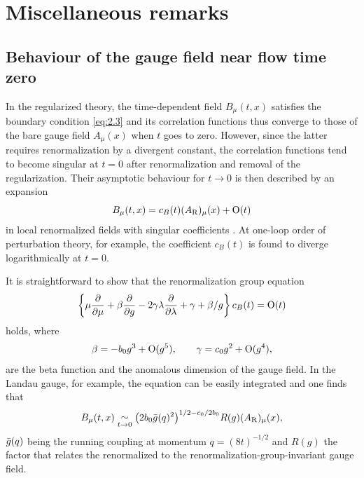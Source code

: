 \section{Miscellaneous remarks}\label{sec:misc}

\subsection{Behaviour of the gauge field near flow time zero}

In the regularized theory, the time-dependent field $B_{\mu}(t,x)$
satisfies the boundary condition \eqref{eq:2.3} and its correlation functions
thus converge to those of the bare gauge field $A_{\mu}(x)$
when $t$ goes to zero. However,
since the latter requires renormalization by a divergent constant,
the correlation functions tend to become singular at $t=0$
after renormalization and removal of the regularization.
Their asymptotic behaviour for $t\to0$ is then
described by an expansion
\begin{equation}
   B_{\mu}(t,x)=c_B(t)(A_{\mathrm{R}})_{\mu}(x)+\mathrm{O}(t)
   \label{eq:8.1}
\end{equation}
in local renormalized fields with singular coefficients \cite{Symanzik}.
At one-loop order of perturbation theory, for example,
the coefficient $c_B(t)$ is found to
diverge logarithmically at $t=0$.

It is straightforward to show that the
renormalization group equation
\begin{equation}
   \left\{\mu{\partial\over\partial\mu}+\beta{\partial\over\partial g}
   -2\gamma\lambda{\partial\over\partial\lambda}
   +\gamma+\beta/g
   \right\}c_B(t)=\mathrm{O}(t)
   \label{eq:8.2}
\end{equation}
holds, where
\begin{equation}
   \beta=-b_0g^3+\mathrm{O}(g^5),
   \qquad
   \gamma=c_0g^2+\mathrm{O}(g^4),
   \label{eq:8.3}
\end{equation}
are the beta function and the anomalous dimension of the
gauge field. In the Landau gauge, for example,
the equation can be easily integrated and one finds that
\begin{equation}
   B_{\mu}(t,x)
   \mathrel{\mathop\sim_{t\to0}}
   \bigl(2b_0\bar{g}(q)^2\bigr)^{1/2-c_0/2b_0}
   R(g)(A_{\mathrm{R}})_{\mu}(x),
   \label{eq:8.4}
\end{equation}
$\bar{g}(q)$ being the running coupling at momentum $q=(8t)^{-1/2}$
and $R(g)$ the factor that relates the renormalized to
the renormalization-group-invariant gauge field.

